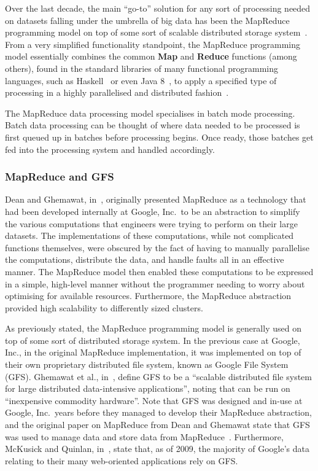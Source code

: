Over the last decade, the main ``go-to'' solution for any sort of processing needed on datasets falling under the
umbrella of big data has been the MapReduce programming model on top of some sort of scalable distributed storage
system~\cite{bifet_mining_2013}. From a very simplified functionality standpoint, the MapReduce programming model essentially
combines the common \textbf{Map} and \textbf{Reduce} functions (among others), found in the standard libraries of many functional
programming languages, such as Haskell~\cite{lammel2008google} or even Java 8~\cite{su2014changing}, to apply a specified
type of processing in a highly parallelised and distributed fashion~\cite{yang2007map}.

The MapReduce data processing model specialises in batch mode processing. Batch data processing can be thought of where
data needed to be processed is first queued up in batches before processing begins. Once ready, those batches get fed
into the processing system and handled accordingly. %

\subsubsection{MapReduce and GFS} %
\label{ssub:mapreduce_and_gfs}

Dean and Ghemawat, in~\cite{dean_mapreduce:_2008}, originally presented MapReduce as a technology that had been
developed internally at Google, Inc.\ to be an abstraction to simplify the various computations that engineers were
trying to perform on their large datasets. The implementations of these computations, while not complicated functions
themselves, were obscured by the fact of having to manually parallelise the computations, distribute the data, and
handle faults all in an effective manner. The MapReduce model then enabled these computations to be expressed in a
simple, high-level manner without the programmer needing to worry about optimising for available resources. Furthermore,
the MapReduce abstraction provided high scalability to differently sized clusters.

As previously stated, the MapReduce programming model is generally used on top of some sort of distributed storage
system. In the previous case at Google, Inc., in the original MapReduce implementation, it was implemented on top of
their own proprietary distributed file system, known as Google File System (GFS). Ghemawat et al.,
in~\cite{ghemawat_google_2003}, define GFS to be a ``scalable distributed file system for large distributed data-intensive
applications'', noting that can be run on ``inexpensive commodity hardware''. Note that GFS was designed and in-use
at Google, Inc.\ years before they managed to develop their MapReduce abstraction, and the original paper on MapReduce
from Dean and Ghemawat state that GFS was used to manage data and store data from MapReduce~\cite{dean_mapreduce:_2008}.
Furthermore, McKusick and Quinlan, in~\cite{mckusick2009gfs}, state that, as of 2009, the majority of Google's data
relating to their many web-oriented applications rely on GFS.

